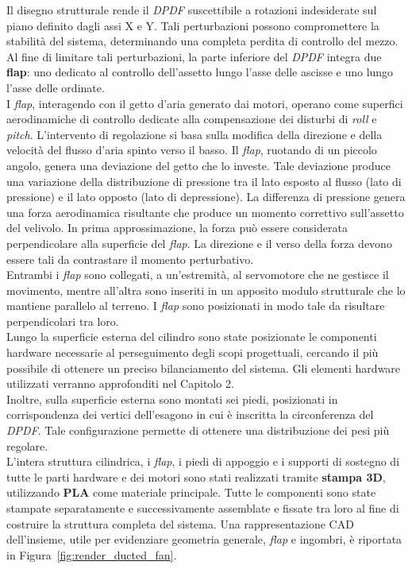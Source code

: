 \documentclass[11pt]{report}
\begin{document}
	\newpage
	Il disegno strutturale rende il \textit{DPDF} suscettibile a rotazioni indesiderate sul piano definito dagli assi X e Y. Tali perturbazioni possono compromettere la stabilità del sistema, determinando una completa perdita di controllo del mezzo.\\
	Al fine di limitare tali perturbazioni, la parte inferiore del \textit{DPDF} integra due \textbf{flap}: uno dedicato al controllo dell'assetto lungo l'asse delle ascisse e uno lungo l'asse delle ordinate.\\
	I \textit{flap}, interagendo con il getto d'aria generato dai motori, operano come superfici aerodinamiche di controllo dedicate alla compensazione dei disturbi di \textit{roll} e \textit{pitch}. L'intervento di regolazione si basa sulla modifica della direzione e della velocità del flusso d'aria spinto verso il basso. Il \textit{flap}, ruotando di un piccolo angolo, genera una deviazione del getto che lo investe. Tale deviazione produce una variazione della distribuzione di pressione tra il lato esposto al flusso (lato di pressione) e il lato opposto (lato di depressione). La differenza di pressione genera una forza aerodinamica risultante che produce un momento correttivo sull'assetto del velivolo. In prima approssimazione, la forza può essere considerata perpendicolare alla superficie del \textit{flap}. La direzione e il verso della forza devono essere tali da contrastare il momento perturbativo.\\
	Entrambi i \textit{flap} sono collegati, a un'estremità, al servomotore che ne gestisce il movimento, mentre all'altra sono inseriti in un apposito modulo strutturale che lo mantiene parallelo al terreno. I \textit{flap} sono posizionati in modo tale da risultare perpendicolari tra loro.\\
	Lungo la superficie esterna del cilindro sono state posizionate le componenti hardware necessarie al perseguimento degli scopi progettuali, cercando il più possibile di ottenere un preciso bilanciamento del sistema. Gli elementi hardware utilizzati verranno approfonditi nel Capitolo 2.\\
	Inoltre, sulla superficie esterna sono montati sei piedi, posizionati in corrispondenza dei vertici dell'esagono in cui è inscritta la circonferenza del \textit{DPDF}. Tale configurazione permette di ottenere una distribuzione dei pesi più regolare.\\
	L'intera struttura cilindrica, i \textit{flap}, i piedi di appoggio e i supporti di sostegno di tutte le parti hardware e dei motori sono stati realizzati tramite \textbf{stampa 3D}, utilizzando \textbf{PLA} come materiale principale. Tutte le componenti sono state stampate separatamente e successivamente assemblate e fissate tra loro al fine di costruire la struttura completa del sistema.
	Una rappresentazione CAD dell'insieme, utile per evidenziare geometria generale, \textit{flap} e ingombri, è riportata in Figura~\ref{fig:render_ducted_fan}.
	
\end{document}
